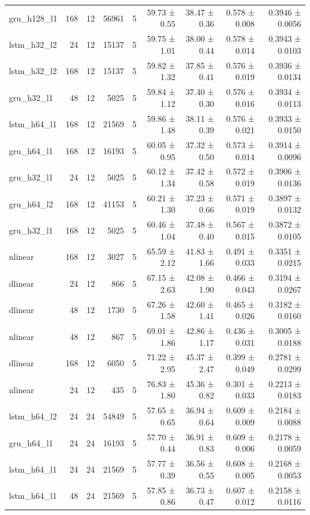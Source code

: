 \begin{table}[htbp]
\begin{tabular}{lrrrrrrrr}
gru\_h128\_l1 & 168 & 12 & 56961 & 5 & 59.73 ± 0.55 & 38.47 ± 0.36 & 0.578 ± 0.008 & 0.3946 ± 0.0056 \\
lstm\_h32\_l2 & 24 & 12 & 15137 & 5 & 59.75 ± 1.01 & 38.00 ± 0.44 & 0.578 ± 0.014 & 0.3943 ± 0.0103 \\
lstm\_h32\_l2 & 168 & 12 & 15137 & 5 & 59.82 ± 1.32 & 37.85 ± 0.41 & 0.576 ± 0.019 & 0.3936 ± 0.0134 \\
gru\_h32\_l1 & 48 & 12 & 5025 & 5 & 59.84 ± 1.12 & 37.40 ± 0.30 & 0.576 ± 0.016 & 0.3934 ± 0.0113 \\
lstm\_h64\_l1 & 168 & 12 & 21569 & 5 & 59.86 ± 1.48 & 38.11 ± 0.39 & 0.576 ± 0.021 & 0.3933 ± 0.0150 \\
gru\_h64\_l1 & 168 & 12 & 16193 & 5 & 60.05 ± 0.95 & 37.32 ± 0.50 & 0.573 ± 0.014 & 0.3914 ± 0.0096 \\
gru\_h32\_l1 & 24 & 12 & 5025 & 5 & 60.12 ± 1.34 & 37.42 ± 0.58 & 0.572 ± 0.019 & 0.3906 ± 0.0136 \\
gru\_h64\_l2 & 168 & 12 & 41153 & 5 & 60.21 ± 1.30 & 37.23 ± 0.66 & 0.571 ± 0.019 & 0.3897 ± 0.0132 \\
gru\_h32\_l1 & 168 & 12 & 5025 & 5 & 60.46 ± 1.04 & 37.48 ± 0.40 & 0.567 ± 0.015 & 0.3872 ± 0.0105 \\
nlinear & 168 & 12 & 3027 & 5 & 65.59 ± 2.12 & 41.83 ± 1.66 & 0.491 ± 0.033 & 0.3351 ± 0.0215 \\
dlinear & 24 & 12 & 866 & 5 & 67.15 ± 2.63 & 42.08 ± 1.90 & 0.466 ± 0.043 & 0.3194 ± 0.0267 \\
dlinear & 48 & 12 & 1730 & 5 & 67.26 ± 1.58 & 42.60 ± 1.41 & 0.465 ± 0.026 & 0.3182 ± 0.0160 \\
nlinear & 48 & 12 & 867 & 5 & 69.01 ± 1.86 & 42.86 ± 1.17 & 0.436 ± 0.031 & 0.3005 ± 0.0188 \\
dlinear & 168 & 12 & 6050 & 5 & 71.22 ± 2.95 & 45.37 ± 2.47 & 0.399 ± 0.049 & 0.2781 ± 0.0299 \\
nlinear & 24 & 12 & 435 & 5 & 76.83 ± 1.80 & 45.36 ± 0.82 & 0.301 ± 0.033 & 0.2213 ± 0.0183 \\
lstm\_h64\_l2 & 24 & 24 & 54849 & 5 & 57.65 ± 0.65 & 36.94 ± 0.64 & 0.609 ± 0.009 & 0.2184 ± 0.0088 \\
gru\_h64\_l1 & 24 & 24 & 16193 & 5 & 57.70 ± 0.44 & 36.91 ± 0.83 & 0.609 ± 0.006 & 0.2178 ± 0.0059 \\
lstm\_h64\_l1 & 24 & 24 & 21569 & 5 & 57.77 ± 0.39 & 36.56 ± 0.55 & 0.608 ± 0.005 & 0.2168 ± 0.0053 \\
lstm\_h64\_l1 & 48 & 24 & 21569 & 5 & 57.85 ± 0.86 & 36.73 ± 0.47 & 0.607 ± 0.012 & 0.2158 ± 0.0116 \\

\end{tabular}
\end{table}

